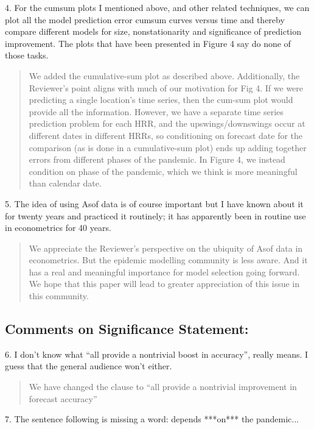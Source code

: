 \documentclass[11pt]{article}
\newenvironment{resp}{\begin{quote}\color{cobalt}}{\end{quote}}
\begin{document}
4. For the cumsum plots I mentioned above, and other related techniques, we can
plot all the model prediction error cumsum curves versus time and thereby
compare different models for size, nonstationarity and significance of
prediction improvement. The plots that have been presented in Figure 4 say do
none of those tasks.

\begin{resp}
  We added the cumulative-sum plot as described above. Additionally, the
  Reviewer's point aligns with much of  our motivation for Fig 4. If we were
  predicting a single location's 
  time series, then the cum-sum plot would provide all the information.
  However, we have a separate time series prediction problem for each HRR, and
  the upswings/downswings occur at different dates in different HRRs, so
  conditioning on forecast date for the comparison (as is done in a
  cumulative-sum plot) ends up adding together errors from different phases
  of the pandemic. In Figure 4, we instead condition on phase of the pandemic,
  which we think is more meaningful than calendar date. 
\end{resp}

5. The idea of using Asof data is of course important but I have known about it
for twenty years and practiced it routinely; it has apparently been in routine
use in econometrics for 40 years.

\begin{resp}
  We appreciate the Reviewer's perspective on the ubiquity of Asof data in
  econometrics. But the epidemic modelling community is less aware. And it
  has a real and meaningful importance for model selection going forward. We
  hope that this paper will lead to greater appreciation of this issue in this
  community. 
\end{resp}

\subsection*{Comments on Significance Statement:}

6. I don't know what ``all provide a nontrivial boost in accuracy'', really
means. I guess that the general audience won't either.

\begin{resp}
  We have changed the clause to ``all provide a nontrivial improvement in
  forecast accuracy''
\end{resp}

7. The sentence following is missing a word: depends ***on*** the pandemic...
\end{document}
